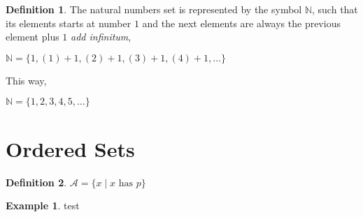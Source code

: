 \documentclass[11pt, a4paper]{amsart}
\numberwithin{equation}{section}
\theoremstyle{plain} %
\theoremstyle{definition}
\newtheorem{defn}{Definition}[section]
\newtheorem{ex}{Example}[section]
\theoremstyle{remark}
\begin{document}
\begin{defn}
    The natural numbers set is represented by the symbol $\mathbb{N}$, such that its elements starts at number $1$ and the next elements are always the previous element plus $1$ \textit{add infinitum},
    \begin{center}
        $\mathbb{N}=\lbrace1,(1)+1,(2)+1,(3)+1,(4)+1,\dots\rbrace$
    \end{center}
    This way,
    \begin{center}
        $\mathbb{N}=\lbrace1,2,3,4,5,\dots\rbrace$
    \end{center}
\end{defn}




\section{Ordered Sets}

\begin{defn}
$\mathcal{A}=\lbrace x\mid x \text{ has } p\rbrace$
\end{defn}

\begin{ex}
test
\end{ex}




\begin{bibdiv}
        \begin{biblist}
        \end{biblist}
    \end{bibdiv}
\end{document}
